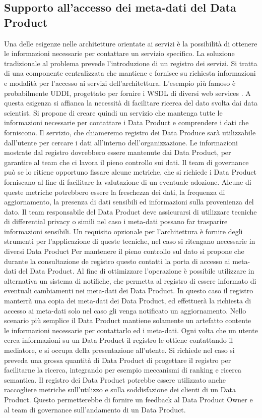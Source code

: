 \documentclass[12pt]{report}
\begin{document}
\subsection{Supporto all'accesso dei meta-dati del Data Product}
Una delle esigenze nelle architetture orientate ai servizi è la possibilità di ottenere le informazioni necessarie per contattare un servizio specifico.
La soluzione tradizionale al problema prevede l'introduzione di un registro dei servizi. 
Si tratta di una componente centralizzata che mantiene e fornisce su richiesta informazioni e modalità per l'accesso ai servizi dell'architettura.
L'esempio più famoso è probabilmente UDDI,  progettato per fornire i WSDL di diversi web services \cite{curbera2002unraveling}.
A questa esigenza si affianca la necessità di facilitare ricerca del dato svolta dai data scientist.
Si propone di creare quindi un servizio che mantenga tutte le informazioni necessarie per contattare i Data Product e comprendere i dati che forniscono.
Il servizio, che chiameremo registro dei Data Produce sarà utilizzabile dall'utente per cercare i dati all'interno dell'organizzazione. 
Le informazioni mostrate dal registro dovrebbero essere mantenute dai Data Product, per garantire al team che ci lavora il pieno controllo sui dati.
Il team di governance può se lo ritiene opportuno fissare alcune metriche, che si richiede i Data Product forniscano al fine di facilitare la valutazione di un eventuale adozione.
Alcune di queste metriche potrebbero essere la freschezza dei dati, la frequenza di aggiornamento, la presenza di dati sensibili ed informazioni sulla provenienza del dato.
Il team responsabile del Data Product deve assicurarsi di utilizzare tecniche di differential privacy o simili nel caso i meta-dati possano far trasparire informazioni sensibili.
Un requisito opzionale per l'architettura è fornire degli strumenti per l'applicazione di queste tecniche, nel caso si ritengano necessarie in diversi Data Product
Per mantenere il pieno controllo sul dato si propone che durante la consultazione de registro questo contatti la porta di accesso ai meta-dati del Data Product.
Al fine di ottimizzare l'operazione è possibile utilizzare in alternativa un sistema di notifiche, che permetta al registro di essere informato di eventuali cambiamenti nei meta-dati dei Data Product.
In questo caso il registro manterrà una copia dei meta-dati dei Data Product, ed effettuerà la richiesta di accesso ai meta-dati solo nel caso gli venga notificato un aggiornamento.
Nello scenario più semplice il Data Product mantiene solamente un artefatto contente le informazioni necessarie per contattarlo ed i meta-dati.
Ogni volta che un utente cerca informazioni su un Data Product il registro le ottiene contattando il mediatore, e si occupa della presentazione all'utente.
Si richiede nel caso si preveda una grossa quantità di Data Product di progettare il registro per facilitarne la ricerca, integrando per esempio meccanismi di ranking e ricerca semantica.
Il registro dei Data Product potrebbe essere utilizzato anche raccogliere metriche sull'utilizzo e sulla soddisfazione dei clienti di un Data Product.
Questo permetterebbe di fornire un feedback al Data Product Owner e al team di governance sull'andamento di un Data Product.
\end{document}
